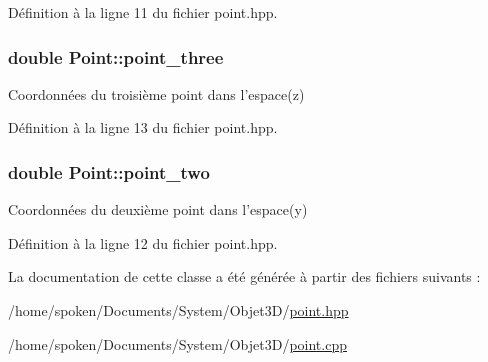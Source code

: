 Définition à la ligne 11 du fichier point.\-hpp.

\hypertarget{class_point_af7cb3c4c0c0f52218ac9ce180df003da}{
\subsubsection[{point\-\_\-three}]{\setlength{\rightskip}{0pt plus 5cm}double Point\-::point\-\_\-three\hspace{0.3cm}{\ttfamily [private]}}}\label{class_point_af7cb3c4c0c0f52218ac9ce180df003da}
Coordonnées du troisième point dans l'espace(z) 

Définition à la ligne 13 du fichier point.\-hpp.

\hypertarget{class_point_a7eece7f7413a741137cf32bb763f3987}{
\subsubsection[{point\-\_\-two}]{\setlength{\rightskip}{0pt plus 5cm}double Point\-::point\-\_\-two\hspace{0.3cm}{\ttfamily [private]}}}\label{class_point_a7eece7f7413a741137cf32bb763f3987}
Coordonnées du deuxième point dans l'espace(y) 

Définition à la ligne 12 du fichier point.\-hpp.



La documentation de cette classe a été générée à partir des fichiers suivants \-:\begin{DoxyCompactItemize}
\item 
/home/spoken/\-Documents/\-System/\-Objet3\-D/\hyperlink{point_8hpp}{point.\-hpp}\item 
/home/spoken/\-Documents/\-System/\-Objet3\-D/\hyperlink{point_8cpp}{point.\-cpp}\end{DoxyCompactItemize}
